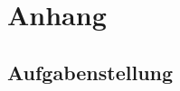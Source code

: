 \documentclass[../main.tex]{subfiles}
\begin{document}
\newpage
\section{Anhang}

\subsection{Aufgabenstellung} \label{aufgabenstellung}


\end{document}
